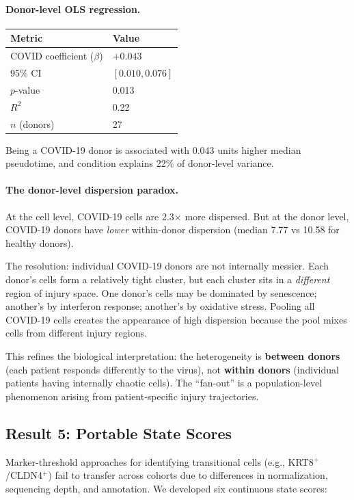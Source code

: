 \documentclass[11pt]{article}
\begin{document}
\paragraph{Donor-level OLS regression.}
\begin{center}
\small
\begin{tabular}{ll}
\toprule
Metric & Value \\
\midrule
COVID coefficient ($\beta$) & $+0.043$ \\
95\% CI & $[0.010, 0.076]$ \\
$p$-value & 0.013 \\
$R^2$ & 0.22 \\
$n$ (donors) & 27 \\
\bottomrule
\end{tabular}
\end{center}

Being a COVID-19 donor is associated with 0.043 units higher median pseudotime, and condition explains 22\% of donor-level variance.

\paragraph{The donor-level dispersion paradox.} At the cell level, COVID-19 cells are 2.3$\times$ more dispersed. But at the donor level, COVID-19 donors have \emph{lower} within-donor dispersion (median 7.77 vs 10.58 for healthy donors).

The resolution: individual COVID-19 donors are not internally messier. Each donor's cells form a relatively tight cluster, but each cluster sits in a \emph{different} region of injury space. One donor's cells may be dominated by senescence; another's by interferon response; another's by oxidative stress. Pooling all COVID-19 cells creates the appearance of high dispersion because the pool mixes cells from different injury regions.

This refines the biological interpretation: the heterogeneity is \textbf{between donors} (each patient responds differently to the virus), not \textbf{within donors} (individual patients having internally chaotic cells). The ``fan-out'' is a population-level phenomenon arising from patient-specific injury trajectories.

\subsection{Result 5: Portable State Scores}

Marker-threshold approaches for identifying transitional cells (e.g., KRT8$^+$/CLDN4$^+$) fail to transfer across cohorts due to differences in normalization, sequencing depth, and annotation. We developed six continuous state scores:
\end{document}

